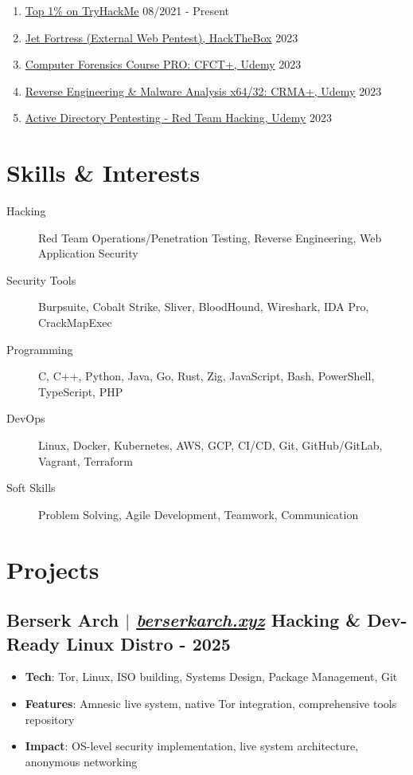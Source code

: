 \documentclass[11pt]{article}
\newcommand{\projectSubheading}[4]{
    \subsection{#1 $|$ \normalfont\textit{\href{#2}{#3}} \hfill #4}
    \vspace{3pt}
}
\begin{document}
\begin{enumerate}[label=\null]
    \item \href{https://tryhackme.com/p/thehackersbrain}{Top 1\% on TryHackMe} \hfill 08/2021 - Present
    \item \href{https://www.instagram.com/p/CpqIzPHPiM5/}{Jet Fortress (External Web Pentest), HackTheBox} \hfill 2023
    \item \href{https://www.udemy.com/certificate/UC-11c0ac06-52c6-4b05-b48a-a91552b8eeed/}{Computer Forensics Course PRO: CFCT+, Udemy} \hfill 2023
    \item \href{https://www.udemy.com/certificate/UC-2d40b62d-ed80-4b82-9922-896ee12cb989/}{Reverse Engineering \& Malware Analysis x64/32: CRMA+, Udemy} \hfill 2023
    \item \href{https://www.udemy.com/certificate/UC-4ae950ef-117a-4a64-b845-c545d7714d77/}{Active Directory Pentesting - Red Team Hacking, Udemy} \hfill 2023
\end{enumerate}

\section{Skills \& Interests}

\begin{description}
    \item[Hacking] Red Team Operations/Penetration Testing, Reverse Engineering, Web Application Security
    \item[Security Tools] Burpsuite, Cobalt Strike, Sliver, BloodHound, Wireshark, IDA Pro, CrackMapExec
    \item[Programming] C, C++, Python, Java, Go, Rust, Zig, JavaScript, Bash, PowerShell, TypeScript, PHP
    \item[DevOps] Linux, Docker, Kubernetes, AWS, GCP, CI/CD, Git, GitHub/GitLab, Vagrant, Terraform
    \item[Soft Skills] Problem Solving, Agile Development, Teamwork, Communication
\end{description}

\section{Projects}

\projectSubheading
    {Berserk Arch}{https://berserkarch.xyz/}{berserkarch.xyz}
    {Hacking \& Dev-Ready Linux Distro - \textbf{2025}}
\begin{itemize}
    \item \textbf{Tech}: Tor, Linux, ISO building, Systems Design, Package Management, Git
    \item \textbf{Features}: Amnesic live system, native Tor integration, comprehensive tools repository
    \item \textbf{Impact}: OS-level security implementation, live system architecture, anonymous networking
\end{itemize}
\vspace{3pt}
\end{document}
